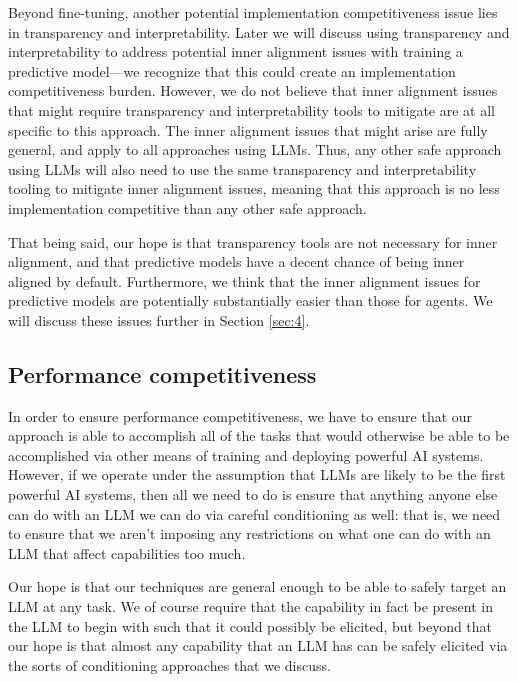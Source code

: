 \documentclass[
  onecolumn,
  nonatbib,
]{miri-tech-article}
\begin{document}
Beyond fine-tuning, another potential implementation competitiveness issue lies in transparency and interpretability. Later we will discuss using transparency and interpretability to address potential inner alignment issues with training a predictive model---we recognize that this could create an implementation competitiveness burden. However, we do not believe that inner alignment issues that might require transparency and interpretability tools to mitigate are at all specific to this approach. The inner alignment issues that might arise are fully general, and apply to all approaches using LLMs. Thus, any other safe approach using LLMs will also need to use the same transparency and interpretability tooling to mitigate inner alignment issues, meaning that this approach is no less implementation competitive than any other safe approach.

That being said, our hope is that transparency tools are not necessary for inner alignment, and that predictive models have a decent chance of being inner aligned by default. Furthermore, we think that the inner alignment issues for predictive models are potentially substantially easier than those for agents. We will discuss these issues further in Section \ref{sec:4}.


\subsection{Performance competitiveness}

In order to ensure performance competitiveness, we have to ensure that our approach is able to accomplish all of the tasks that would otherwise be able to be accomplished via other means of training and deploying powerful AI systems. However, if we operate under the assumption that LLMs are likely to be the first powerful AI systems, then all we need to do is ensure that anything anyone else can do with an LLM we can do via careful conditioning as well: that is, we need to ensure that we aren't imposing any restrictions on what one can do with an LLM that affect capabilities too much.

Our hope is that our techniques are general enough to be able to safely target an LLM at any task. We of course require that the capability in fact be present in the LLM to begin with such that it could possibly be elicited, but beyond that our hope is that almost any capability that an LLM has can be safely elicited via the sorts of conditioning approaches that we discuss.
\end{document}
